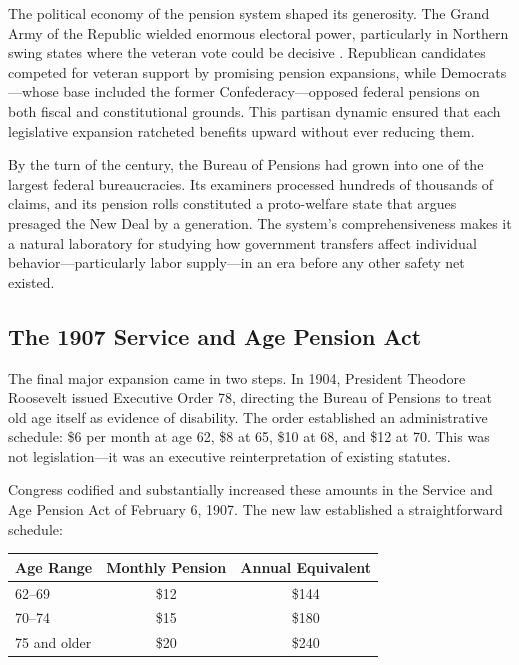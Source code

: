 \documentclass[12pt]{article}
\begin{document}
The political economy of the pension system shaped its generosity. The Grand Army of the Republic wielded enormous electoral power, particularly in Northern swing states where the veteran vote could be decisive \citep{skocpol1993americas}. Republican candidates competed for veteran support by promising pension expansions, while Democrats---whose base included the former Confederacy---opposed federal pensions on both fiscal and constitutional grounds. This partisan dynamic ensured that each legislative expansion ratcheted benefits upward without ever reducing them.

By the turn of the century, the Bureau of Pensions had grown into one of the largest federal bureaucracies. Its examiners processed hundreds of thousands of claims, and its pension rolls constituted a proto-welfare state that \citet{skocpol1992protecting} argues presaged the New Deal by a generation. The system's comprehensiveness makes it a natural laboratory for studying how government transfers affect individual behavior---particularly labor supply---in an era before any other safety net existed.

\subsection{The 1907 Service and Age Pension Act}

The final major expansion came in two steps. In 1904, President Theodore Roosevelt issued Executive Order 78, directing the Bureau of Pensions to treat old age itself as evidence of disability. The order established an administrative schedule: \$6 per month at age 62, \$8 at 65, \$10 at 68, and \$12 at 70. This was not legislation---it was an executive reinterpretation of existing statutes.

Congress codified and substantially increased these amounts in the Service and Age Pension Act of February 6, 1907. The new law established a straightforward schedule:

\begin{center}
\begin{tabular}{lcc}
\toprule
Age Range & Monthly Pension & Annual Equivalent \\
\midrule
62--69 & \$12 & \$144 \\
70--74 & \$15 & \$180 \\
75 and older & \$20 & \$240 \\
\bottomrule
\end{tabular}
\end{center}
\end{document}
